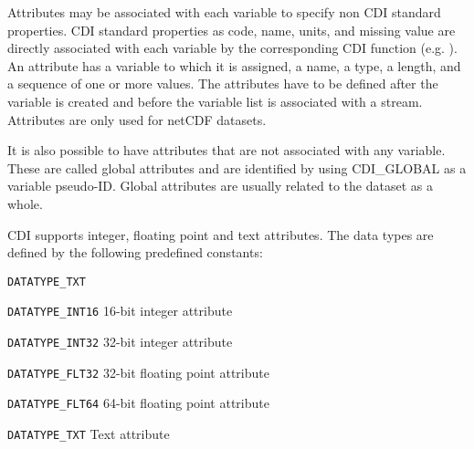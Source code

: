 Attributes may be associated with each variable to specify non
CDI standard properties. CDI standard properties as code, name,
units, and missing value are directly associated with each variable by
the corresponding CDI function (e.g. {}).
An attribute has a variable to which it is assigned, a name, a type,
a length, and a sequence of one or more values.
The attributes have to be defined after the variable is created and 
before the variable list is associated with a stream.
Attributes are only used for netCDF datasets.

It is also possible to have attributes that are not associated with any variable.
These are called global attributes and are identified by using CDI\_GLOBAL as a 
variable pseudo-ID. Global attributes are usually related to the dataset as a whole.

CDI supports integer, floating point and text attributes. The data types are defined 
by the following predefined constants:

\vspace*{3mm}
\hspace*{8mm}\begin{minipage}{15cm}
\begin{deflist}{{\large\tt DATATYPE\_TXT \ \ }}
\item[{\large\tt DATATYPE\_INT16}]   16-bit integer attribute
\item[{\large\tt DATATYPE\_INT32}]   32-bit integer attribute
\item[{\large\tt DATATYPE\_FLT32}]   32-bit floating point attribute
\item[{\large\tt DATATYPE\_FLT64}]   64-bit floating point attribute
\item[{\large\tt DATATYPE\_TXT}]     Text attribute
\end{deflist}
\end{minipage}
